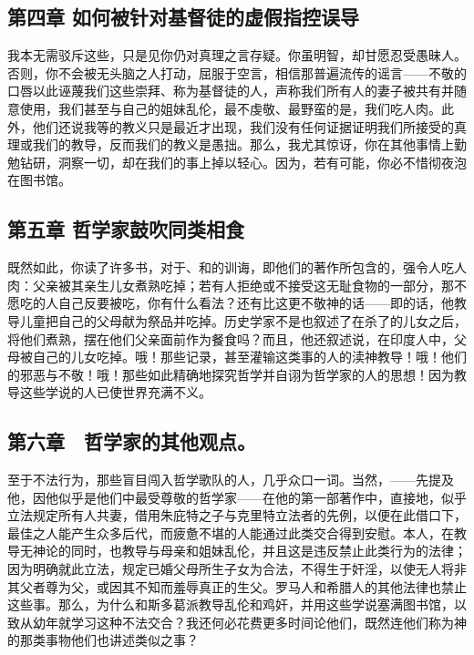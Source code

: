
\subsection{第四章 如何被针对基督徒的虚假指控误导}

我本无需驳斥这些，只是见你仍对真理之言存疑。你虽明智，却甘愿忍受愚昧人。否则，你不会被无头脑之人打动，屈服于空言，相信那普遍流传的谣言——不敬的口唇以此诬蔑我们这些崇拜、称为基督徒的人，声称我们所有人的妻子被共有并随意使用，我们甚至与自己的姐妹乱伦，最不虔敬、最野蛮的是，我们吃人肉。此外，他们还说我等的教义只是最近才出现，我们没有任何证据证明我们所接受的真理或我们的教导，反而我们的教义是愚拙。那么，我尤其惊讶，你在其他事情上勤勉钻研，洞察一切，却在我们的事上掉以轻心。因为，若有可能，你必不惜彻夜泡在图书馆。\par


\subsection{第五章 哲学家鼓吹同类相食}

既然如此，你读了许多书，对于、和的训诲，即他们的著作所包含的，强令人吃人肉：父亲被其亲生儿女煮熟吃掉；若有人拒绝或不接受这无耻食物的一部分，那不愿吃的人自己反要被吃，你有什么看法？还有比这更不敬神的话——即的话，他教导儿童把自己的父母献为祭品并吃掉。历史学家不是也叙述了在杀了的儿女之后，将他们煮熟，摆在他们父亲面前作为餐食吗？而且，他还叙述说，在印度人中，父母被自己的儿女吃掉。哦！那些记录，甚至灌输这类事的人的渎神教导！哦！他们的邪恶与不敬！哦！那些如此精确地探究哲学并自诩为哲学家的人的思想！因为教导这些学说的人已使世界充满不义。\par


\subsection{第六章　哲学家的其他观点。}

至于不法行为，那些盲目闯入哲学歌队的人，几乎众口一词。当然，——先提及他，因他似乎是他们中最受尊敬的哲学家——在他的第一部著作中，直接地，似乎立法规定所有人共妻，借用朱庇特之子与克里特立法者的先例，以便在此借口下，最佳之人能产生众多后代，而疲惫不堪的人能通过此类交合得到安慰。本人，在教导无神论的同时，也教导与母亲和姐妹乱伦，并且这是违反禁止此类行为的法律；因为明确就此立法，规定已婚父母所生子女为合法，不得生于奸淫，以使无人将非其父者尊为父，或因其不知而羞辱真正的生父。罗马人和希腊人的其他法律也禁止这些事。那么，为什么和斯多葛派教导乱伦和鸡奸，并用这些学说塞满图书馆，以致从幼年就学习这种不法交合？我还何必花费更多时间论他们，既然连他们称为神的那类事物他们也讲述类似之事？\par

